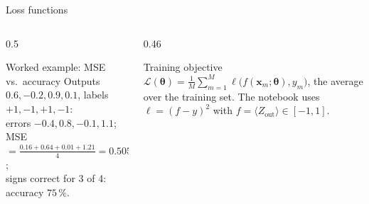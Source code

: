 \documentclass[aspectratio=169,11pt]{beamer}
\newcommand{\btheta}{\boldsymbol\theta}
\newcommand{\bx}{\mathbf x}
\begin{document}
\begin{frame}[label=fLoss]{Loss functions}
  \footnotesize
  \begin{center}
  \renewcommand{\arraystretch}{1.25}
  \end{center}
  \begin{columns}[T]
    \begin{column}{0.5\textwidth}
      \begin{exampleblock}{Worked example: MSE vs.\ accuracy}
        \scriptsize Outputs $0.6, -0.2, 0.9, 0.1$, labels $+1, -1, +1, -1$:\\
        errors $-0.4, 0.8, -0.1, 1.1$; MSE $= \frac{0.16 + 0.64 + 0.01 + 1.21}{4} = 0.505$;\\
        signs correct for 3 of 4: accuracy $75\,\%$.
      \end{exampleblock}
    \end{column}
    \begin{column}{0.46\textwidth}
      \begin{block}{Training objective}
        \scriptsize $\displaystyle\mathcal L(\btheta) = \frac1M\sum_{m=1}^{M}\ell\big(f(\bx_m;\btheta), y_m\big)$, the average over the training set.
        The notebook uses $\ell = (f - y)^2$ with $f = \langle Z_{\text{out}}\rangle \in [-1, 1]$.
      \end{block}
    \end{column}
  \end{columns}
\end{frame}
\end{document}
